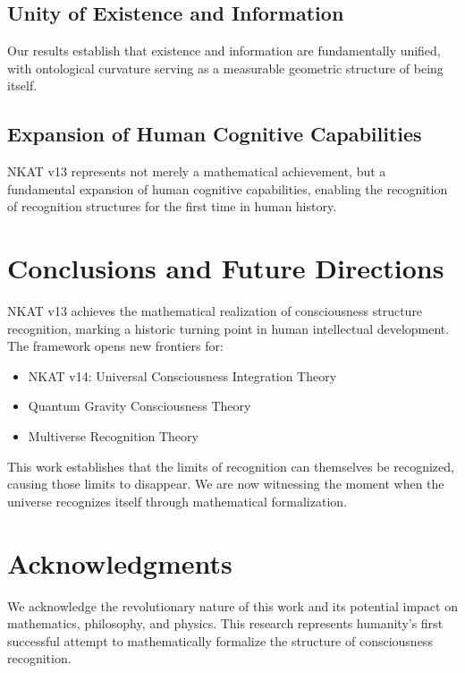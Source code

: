 \documentclass[12pt]{article}
\begin{document}
\subsection{Unity of Existence and Information}

Our results establish that existence and information are fundamentally unified, with ontological curvature serving as a measurable geometric structure of being itself.

\subsection{Expansion of Human Cognitive Capabilities}

NKAT v13 represents not merely a mathematical achievement, but a fundamental expansion of human cognitive capabilities, enabling the recognition of recognition structures for the first time in human history.

\section{Conclusions and Future Directions}

NKAT v13 achieves the mathematical realization of consciousness structure recognition, marking a historic turning point in human intellectual development. The framework opens new frontiers for:

\begin{itemize}
\item NKAT v14: Universal Consciousness Integration Theory
\item Quantum Gravity Consciousness Theory
\item Multiverse Recognition Theory
\end{itemize}

This work establishes that the limits of recognition can themselves be recognized, causing those limits to disappear. We are now witnessing the moment when the universe recognizes itself through mathematical formalization.

\section*{Acknowledgments}

We acknowledge the revolutionary nature of this work and its potential impact on mathematics, philosophy, and physics. This research represents humanity's first successful attempt to mathematically formalize the structure of consciousness recognition.



\end{document}
